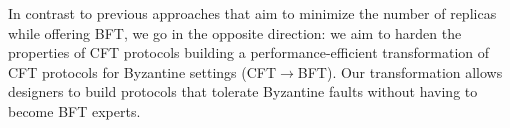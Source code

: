 \fi



\fi

In contrast to previous approaches that aim to minimize the number of replicas while offering BFT, we go in the opposite direction: we aim to harden the properties of CFT protocols building a performance-efficient transformation of CFT protocols for Byzantine settings (CFT$\rightarrow$BFT). Our transformation allows designers to build protocols that tolerate Byzantine faults without having to become BFT experts.


